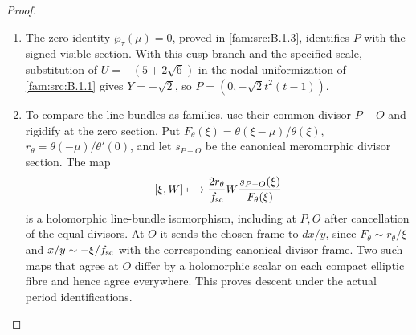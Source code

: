 \begin{proof}
\begin{enumerate}[label=\arabic*.,leftmargin=*]
\item The zero identity $\wp_\tau(\mu)=0$, proved in \ref{fam:src:B.1.3}, identifies $P$ with the signed visible section. With this cusp branch and the specified scale, substitution of $U=-(5+2\sqrt6)$ in the nodal uniformization of \ref{fam:src:B.1.1} gives $Y=-\sqrt2$, so $P=(0,-\sqrt2t^2(t-1))$.

\item To compare the line bundles as families, use their common divisor $P-O$ and rigidify at the zero section. Put $F_\theta(\xi)=\theta(\xi-\mu)/\theta(\xi)$, $r_\theta=\theta(-\mu)/\theta'(0)$, and let $s_{P-O}$ be the canonical meromorphic divisor section. The map
\[
 [\xi,W]\longmapsto\frac{2r_\theta}{f_{\rm sc}}
        W\frac{s_{P-O}(\xi)}{F_\theta(\xi)}
\]
is a holomorphic line-bundle isomorphism, including at $P,O$ after cancellation of the equal divisors. At $O$ it sends the chosen frame to $dx/y$, since $F_\theta\sim r_\theta/\xi$ and $x/y\sim-\xi/f_{\rm sc}$ with the corresponding canonical divisor frame. Two such maps that agree at $O$ differ by a holomorphic scalar on each compact elliptic fibre and hence agree everywhere. This proves descent under the actual period identifications.


\end{enumerate}
\end{proof}
